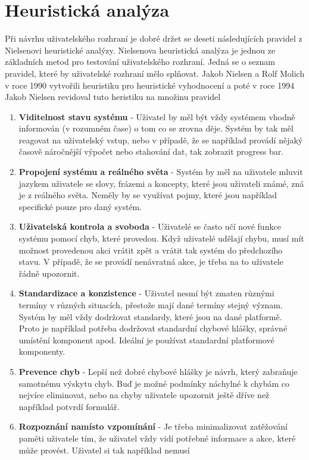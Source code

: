 \documentclass[thesis=M,czech]{FITthesis}[2012/06/26]
\begin{document}
\section{Heuristická analýza}
Při návrhu uživatelského rozhraní je dobré držet se deseti následujících pravidel z Nielsenovi heuristické analýzy. Nielsenova heuristická analýza je jednou ze základních metod pro testování uživatelského rozhraní. Jedná se o seznam pravidel, které by uživatelské rozhraní mělo splňovat. Jakob Nielsen a Rolf Molich v roce 1990 vytvořili heuristiku pro heuristické vyhodnocení a poté v roce 1994 Jakob Nielsen revidoval tuto heristiku na množinu pravidel \cite{heuristika}

\begin{enumerate}
	\item
	\textbf{Viditelnost stavu systému} - Uživatel by měl být vždy systémem vhodně informován (v rozumném čase)
	o tom co se zrovna děje. Systém by tak měl reagovat na uživatelský vstup, nebo v případě, že se například provádí nějaký časově náročnější výpočet nebo
	stahování dat, tak zobrazit progress bar.
	\item
	\textbf{Propojení systému a reálného světa} - Systém by měl na uživatele mluvit jazykem uživatele se slovy, frázemi a koncepty, které jsou uživateli známé, zná je z reálného světa. Neměly by se využívat
	pojmy, které jsou například specifické pouze pro daný systém.
	\item
	\textbf{Uživatelská kontrola a svoboda} - Uživatelé se často učí nové funkce systému pomocí chyb, které provedou. Když uživatelé udělají chybu, musí mít možnost provedenou akci vrátit zpět a vrátit
	tak systém do předchozího stavu. V případě, že se provádí nenávratná akce,
	je třeba na to uživatele řádně upozornit.
	\item
	\textbf{Standardizace a konzistence} - Uživatel nesmí být zmaten různými termíny v různých situacích, přestože mají dané termíny stejný význam. Systém by měl vždy dodržovat standardy, které
	jsou na dané platformě. Proto je například potřeba dodržovat standardní chybové
	hlášky, správné umístění komponent apod. Ideální je používat standardní
	platformové komponenty.
	\item
	\textbf{Prevence chyb} - Lepší než dobré chybové hlášky je návrh, který zabraňuje samotnému výskytu
	chyb. Buď je možné podmínky náchylné k chybám co nejvíce eliminovat, nebo
	na chyby uživatele upozornit ještě dříve než například potvrdí formulář.
	\item
	\textbf{Rozpoznání namísto vzpomínání} - Je třeba minimalizovat zatěžování paměti uživatele tím, že uživatel vždy vidí potřebné informace a akce, které může provést. Uživatel si tak například nemusí

\end{enumerate}
\end{document}
